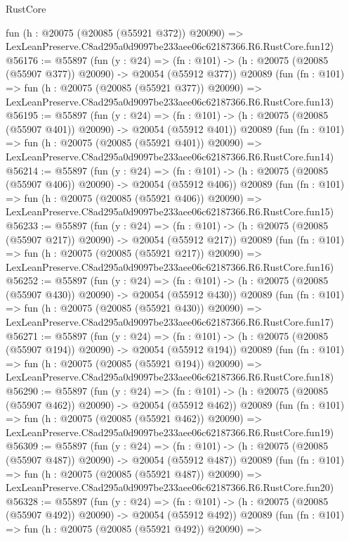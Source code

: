 \begin{lexlean}{RustCore}
\begin{coremodule}
    fun (h : @20075 (@20085 (@55921 @372)) @20090) =>
    LexLeanPreserve.C8ad295a0d9097be233aee06c62187366.R6.RustCore.fun12)
@56176 := @55897
    (fun (y : @24) =>
    (fn : @101) -> (h : @20075 (@20085 (@55907 @377)) @20090) -> @20054 (@55912 @377))
    @20089
    (fun (fn : @101) =>
    fun (h : @20075 (@20085 (@55921 @377)) @20090) =>
    LexLeanPreserve.C8ad295a0d9097be233aee06c62187366.R6.RustCore.fun13)
@56195 := @55897
    (fun (y : @24) =>
    (fn : @101) -> (h : @20075 (@20085 (@55907 @401)) @20090) -> @20054 (@55912 @401))
    @20089
    (fun (fn : @101) =>
    fun (h : @20075 (@20085 (@55921 @401)) @20090) =>
    LexLeanPreserve.C8ad295a0d9097be233aee06c62187366.R6.RustCore.fun14)
@56214 := @55897
    (fun (y : @24) =>
    (fn : @101) -> (h : @20075 (@20085 (@55907 @406)) @20090) -> @20054 (@55912 @406))
    @20089
    (fun (fn : @101) =>
    fun (h : @20075 (@20085 (@55921 @406)) @20090) =>
    LexLeanPreserve.C8ad295a0d9097be233aee06c62187366.R6.RustCore.fun15)
@56233 := @55897
    (fun (y : @24) =>
    (fn : @101) -> (h : @20075 (@20085 (@55907 @217)) @20090) -> @20054 (@55912 @217))
    @20089
    (fun (fn : @101) =>
    fun (h : @20075 (@20085 (@55921 @217)) @20090) =>
    LexLeanPreserve.C8ad295a0d9097be233aee06c62187366.R6.RustCore.fun16)
@56252 := @55897
    (fun (y : @24) =>
    (fn : @101) -> (h : @20075 (@20085 (@55907 @430)) @20090) -> @20054 (@55912 @430))
    @20089
    (fun (fn : @101) =>
    fun (h : @20075 (@20085 (@55921 @430)) @20090) =>
    LexLeanPreserve.C8ad295a0d9097be233aee06c62187366.R6.RustCore.fun17)
@56271 := @55897
    (fun (y : @24) =>
    (fn : @101) -> (h : @20075 (@20085 (@55907 @194)) @20090) -> @20054 (@55912 @194))
    @20089
    (fun (fn : @101) =>
    fun (h : @20075 (@20085 (@55921 @194)) @20090) =>
    LexLeanPreserve.C8ad295a0d9097be233aee06c62187366.R6.RustCore.fun18)
@56290 := @55897
    (fun (y : @24) =>
    (fn : @101) -> (h : @20075 (@20085 (@55907 @462)) @20090) -> @20054 (@55912 @462))
    @20089
    (fun (fn : @101) =>
    fun (h : @20075 (@20085 (@55921 @462)) @20090) =>
    LexLeanPreserve.C8ad295a0d9097be233aee06c62187366.R6.RustCore.fun19)
@56309 := @55897
    (fun (y : @24) =>
    (fn : @101) -> (h : @20075 (@20085 (@55907 @487)) @20090) -> @20054 (@55912 @487))
    @20089
    (fun (fn : @101) =>
    fun (h : @20075 (@20085 (@55921 @487)) @20090) =>
    LexLeanPreserve.C8ad295a0d9097be233aee06c62187366.R6.RustCore.fun20)
@56328 := @55897
    (fun (y : @24) =>
    (fn : @101) -> (h : @20075 (@20085 (@55907 @492)) @20090) -> @20054 (@55912 @492))
    @20089
    (fun (fn : @101) =>
    fun (h : @20075 (@20085 (@55921 @492)) @20090) =>

\end{coremodule}
\end{lexlean}
